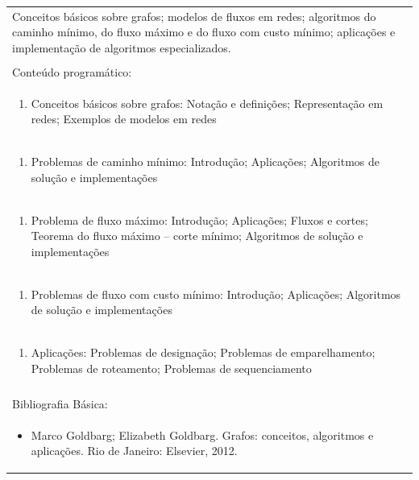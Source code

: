 \documentclass[11pt]{article}
\begin{document}
\begin{center}
\begin{longtable}{|p{4cm}|p{4cm}|p{4cm}|p{4cm}|}
\multicolumn{4}{|p{\dimexpr 16cm + 6\tabcolsep\relax}|}{Conceitos básicos sobre grafos; modelos de fluxos em redes; algoritmos do caminho mínimo, do fluxo máximo e do fluxo com custo mínimo; aplicações e implementação de algoritmos especializados.}\\
\multicolumn{4}{|p{16cm}|}{}\\
\hline
\multicolumn{4}{|p{16cm}|}{Conteúdo programático:}\\*
\multicolumn{4}{|p{\dimexpr 16cm + 6\tabcolsep\relax}|}{\begin{enumerate}[start=1]\item Conceitos básicos sobre grafos: Notação e definições; Representação em redes; Exemplos de modelos em redes\end{enumerate}}\\
\multicolumn{4}{|p{\dimexpr 16cm + 6\tabcolsep\relax}|}{\begin{enumerate}[start=2]\item Problemas de caminho mínimo: Introdução; Aplicações; Algoritmos de solução e implementações\end{enumerate}}\\
\multicolumn{4}{|p{\dimexpr 16cm + 6\tabcolsep\relax}|}{\begin{enumerate}[start=3]\item Problema de fluxo máximo: Introdução; Aplicações; Fluxos e cortes; Teorema do fluxo máximo – corte mínimo; Algoritmos de solução e implementações\end{enumerate}}\\
\multicolumn{4}{|p{\dimexpr 16cm + 6\tabcolsep\relax}|}{\begin{enumerate}[start=4]\item Problemas de fluxo com custo mínimo: Introdução; Aplicações; Algoritmos de solução e implementações\end{enumerate}}\\
\multicolumn{4}{|p{\dimexpr 16cm + 6\tabcolsep\relax}|}{\begin{enumerate}[start=5]\item Aplicações: Problemas de designação; Problemas de emparelhamento; Problemas de roteamento; Problemas de sequenciamento\end{enumerate}}\\
\multicolumn{4}{|p{\dimexpr 16cm + 6\tabcolsep\relax}|}{}\\
\hline
\multicolumn{4}{|p{16cm}|}{Bibliografia Básica:}\\*
\multicolumn{4}{|p{\dimexpr 16cm + 6\tabcolsep\relax}|}{\begin{itemize}\item Marco Goldbarg; Elizabeth Goldbarg. Grafos: conceitos, algoritmos e aplicações. Rio de Janeiro: Elsevier, 2012.\end{itemize}}\\

\end{longtable}
\end{center}
\end{document}
